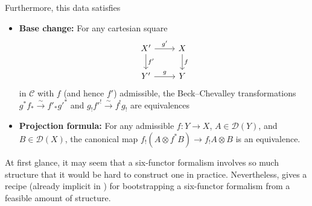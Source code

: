 Furthermore, this data satisfies
\begin{itemize}
\item \textbf{Base change:} For any cartesian square
  \[
    \begin{tikzcd}
      X' \arrow[r, "g'"] \arrow[d, "f'"] & X \arrow[d, "f"] \\
      Y' \arrow[r, "g"] & Y
    \end{tikzcd}
  \]
  in $\mathcal C$ with $f$ (and hence $f'$) admissible, 
  the Beck--Chevalley transformations $g^* f_* \xrightarrow{\sim} f'_* g'^*$ and $g_! f'^! \xrightarrow{\sim} f^! g_!$ are equivalences
\item \textbf{Projection formula:} For any admissible $f\colon Y\to X$, $A \in \mathcal D(Y)$, and $B \in \mathcal D(X)$, the canonical map $f_!(A \otimes f^* B) \to f_! A \otimes B$ is an equivalence.
\end{itemize}

\medskip

At first glance, it may seem that a six-functor formalism involves so much structure that it would be hard to construct one in practice. Nevertheless, \cite{Mann2022} gives a recipe (already implicit in \cite{Liu_Zheng2012}) for bootstrapping a six-functor formalism from a feasible amount of structure.

